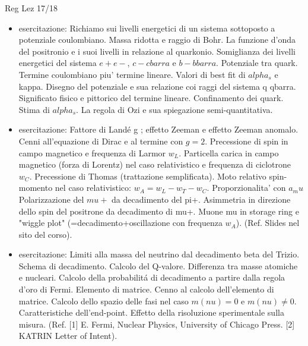 \begin{frame}[allowframebreaks]{Reg Lez 17/18}
\begin{itemize}
\item esercitazione: Richiamo sui livelli energetici di un sistema sottoposto a potenziale coulombiano. Massa ridotta e raggio di Bohr. La funzione d'onda del positronio e i suoi livelli in relazione al quarkonio. Somiglianza dei livelli energetici del sistema $e+e-$, $c-cbarra$ e $b-bbarra$. Potenziale tra quark. Termine coulombiano piu' termine lineare. Valori di best fit di $alpha_s$ e kappa. Disegno del potenziale e sua relazione coi raggi del sistema q qbarra. Significato fisico e pittorico del termine lineare. Confinamento dei quark. Stima di $alpha_s$. La regola di Ozi e sua spiegazione semi-quantitativa.
\item esercitazione: Fattore di Land\'e g ; effetto Zeeman e effetto Zeeman anomalo. Cenni all'equazione di Dirac e al termine con $g=2$. Precessione di spin in campo magnetico e frequenza di Larmor $w_L$. Particella carica in campo magnetico (forza di Lorentz) nel caso relativistico e frequenza di ciclotrone $w_C$. Precessione di Thomas (trattazione semplificata). Moto relativo spin-momento nel caso relativistico: $w_A = w_L - w_T - w_C$. Proporzionalita' con $a_mu$ Polarizzazione del $mu+$ da decadimento del pi+. Asimmetria in direzione dello spin del positrone da decadimento di mu+. Muone mu in storage ring e "wiggle plot" (=decadimento+oscillazione con frequenza $w_A$). (Ref. Slides nel sito del corso).
\item esercitazione: Limiti alla massa del neutrino dal decadimento beta del Trizio. Schema di decadimento. Calcolo del Q-valore. Differenza tra masse atomiche e nucleari. Calcolo della probabilit\'a di decadimento a partire dalla regola d’oro di Fermi. Elemento di matrice. Cenno al calcolo dell’elemento di matrice. Calcolo dello spazio delle fasi nel caso $m(nu)=0$ e $m(nu)\neq0$. Caratteristiche dell’end-point. Effetto della risoluzione sperimentale sulla misura.
(Ref. [1] E. Fermi, Nuclear Physics, University of Chicago Press. [2] KATRIN Letter of Intent).
\end{itemize}
\end{frame}